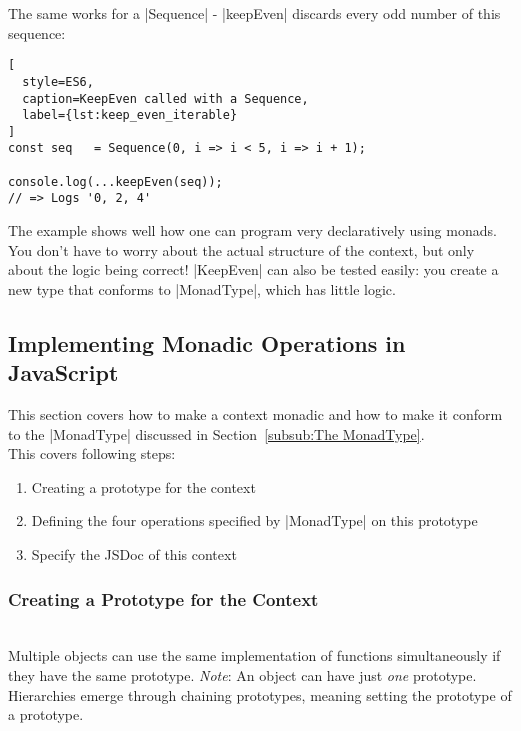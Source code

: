 The same works for a |Sequence| - |keepEven| discards every odd number of this
sequence:

\begin{lstlisting}[
  style=ES6,
  caption=KeepEven called with a Sequence,
  label={lst:keep_even_iterable}
]
const seq   = Sequence(0, i => i < 5, i => i + 1);

console.log(...keepEven(seq));
// => Logs '0, 2, 4'
\end{lstlisting}
The example shows well how one can program very declaratively using monads. You
don't have to worry about the actual structure of the context, but only about
the logic being correct!
|KeepEven| can also be tested easily: you create a new type that conforms to
|MonadType|, which has little logic.

\subsection{Implementing Monadic Operations in JavaScript} %
\label{sub:Implementing Monadic Operations in JavaScript}
This section covers how to make a context monadic and how to make it conform to
the |MonadType| discussed in Section~\ref{subsub:The MonadType}.\\
This covers following steps:
\begin{enumerate}
  \item Creating a prototype for the context
  \item Defining the four operations specified by |MonadType| on this prototype
  \item Specify the JSDoc of this context
\end{enumerate}

\subsubsection{Creating a Prototype for the Context} %
\label{sec:Creating a Prototype for the Context}
\\ 
Multiple objects can use the same implementation of functions simultaneously if
they have the same prototype.
\textit{Note}: An object can have just \textit{one} prototype. Hierarchies
emerge through chaining prototypes, meaning setting the prototype of a
prototype.

